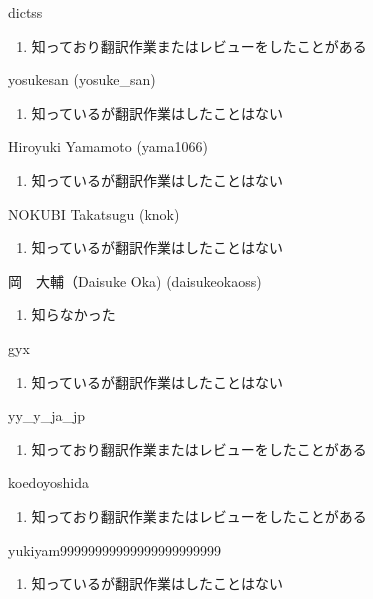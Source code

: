 \begin{prework}{ dictss }
  \begin{enumerate}
  \item 知っており翻訳作業またはレビューをしたことがある
  \end{enumerate}
\end{prework}

\begin{prework}{ yosukesan (yosuke\_san) }
  \begin{enumerate}
  \item 知っているが翻訳作業はしたことはない
  \end{enumerate}
\end{prework}

\begin{prework}{ Hiroyuki Yamamoto (yama1066) }
  \begin{enumerate}
  \item 知っているが翻訳作業はしたことはない
  \end{enumerate}
\end{prework}

\begin{prework}{ NOKUBI Takatsugu (knok) }
  \begin{enumerate}
  \item 知っているが翻訳作業はしたことはない
  \end{enumerate}
\end{prework}

\begin{prework}{ 岡　大輔（Daisuke Oka) (daisukeokaoss) }
  \begin{enumerate}
  \item 知らなかった
  \end{enumerate}
\end{prework}

\begin{prework}{ gyx }
  \begin{enumerate}
  \item 知っているが翻訳作業はしたことはない
  \end{enumerate}
\end{prework}

\begin{prework}{ yy\_y\_ja\_jp }
  \begin{enumerate}
  \item 知っており翻訳作業またはレビューをしたことがある
  \end{enumerate}
\end{prework}

\begin{prework}{ koedoyoshida }
  \begin{enumerate}
  \item 知っており翻訳作業またはレビューをしたことがある
  \end{enumerate}
\end{prework}

\begin{prework}{ yukiyam99999999999999999999999 }
  \begin{enumerate}
  \item 知っているが翻訳作業はしたことはない
  \end{enumerate}
\end{prework}
